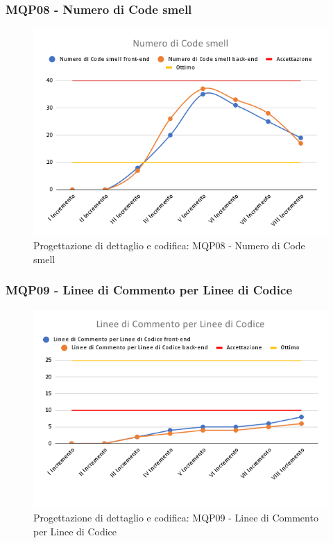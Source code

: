 \subsubsection{MQP08 - Numero di Code smell}
\begin{figure}[H]
    \centering
    \includegraphics[scale=0.50]{Sezioni/images/pb prodotto/Numero di Code smell.png}
    \caption{Progettazione di dettaglio e codifica: MQP08 - Numero di Code smell}
\end{figure}
\subsubsection{MQP09 - Linee di Commento per Linee di Codice}
\begin{figure}[H]
    \centering
    \includegraphics[scale=0.50]{Sezioni/images/pb prodotto/Linee di Commento per Linee di Codice.png}
    \caption{Progettazione di dettaglio e codifica: MQP09 - Linee di Commento per Linee di Codice}
\end{figure}
